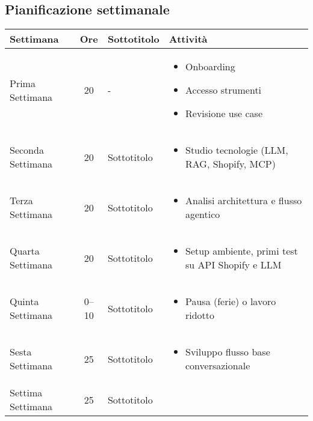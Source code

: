 \subsection{Pianificazione settimanale}

\begin{table}[h]
\centering
\begin{tabular}{@{}l c l X@{}}
\toprule
\textbf{Settimana} & \textbf{Ore} & \textbf{Sottotitolo} & \textbf{Attività} \\
\midrule
Prima Settimana & 20 & - & \multicolumn{1}{X}{%
    \begin{itemize}
    \item Onboarding
    \item Accesso strumenti
    \item Revisione use case
    \end{itemize}} \\
    \midrule
Seconda Settimana & 20 & Sottotitolo & \multicolumn{1}{X}{%
    \begin{itemize}
    \item Studio tecnologie (LLM, RAG, Shopify, MCP)
    \end{itemize}} \\
    \midrule
Terza Settimana & 20 & Sottotitolo & \multicolumn{1}{X}{%
    \begin{itemize}
    \item Analisi architettura e flusso agentico
    \end{itemize}} \\
    \midrule
Quarta Settimana & 20 & Sottotitolo & \multicolumn{1}{X}{%
    \begin{itemize}
    \item Setup ambiente, primi test su API Shopify e LLM
    \end{itemize}} \\
    \midrule
Quinta Settimana & 0--10 & Sottotitolo & \multicolumn{1}{X}{%
    \begin{itemize}
    \item Pausa (ferie) o lavoro ridotto
    \end{itemize}} \\
    \midrule
Sesta Settimana & 25 & Sottotitolo & \multicolumn{1}{X}{%
    \begin{itemize}
    \item Sviluppo flusso base conversazionale
    \end{itemize}} \\
    \midrule
Settima Settimana & 25 & Sottotitolo & \multicolumn{1}{X}{%
}
\end{tabular}
\end{table}
